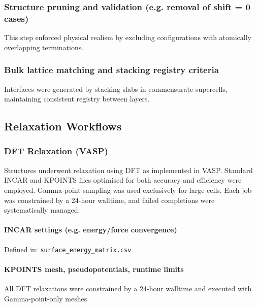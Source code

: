 \subsubsection{Structure pruning and validation (e.g. removal of shift = 0 cases)}

This step enforced physical realism by excluding configurations with atomically overlapping terminations.

\subsubsection{Bulk lattice matching and stacking registry criteria}

Interfaces were generated by stacking slabs in commensurate supercells, maintaining consistent registry between layers.

\subsection{Relaxation Workflows}

\subsubsection{DFT Relaxation (VASP)}

Structures underwent relaxation using DFT as implemented in VASP. Standard INCAR and KPOINTS files optimised for both accuracy and efficiency were employed. Gamma-point sampling was used exclusively for large cells. Each job was constrained by a 24-hour walltime, and failed completions were systematically managed.

\paragraph{INCAR settings (e.g. energy/force convergence)}

Defined in: \texttt{surface\_energy\_matrix.csv}


\paragraph{KPOINTS mesh, pseudopotentials, runtime limits}

All DFT relaxations were constrained by a 24-hour walltime and executed with Gamma-point-only meshes.


